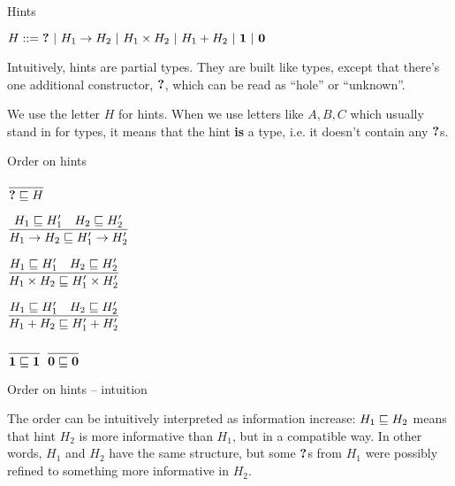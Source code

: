 \documentclass{beamer}
\begin{document}
\begin{frame}{Hints}

$H ::= \textbf{?} \ |\  H_1 \to H_2 \ |\  H_1 \times H_2 \ |\  H_1 + H_2 \ |\  \textbf{1} \ |\  \textbf{0}$

\vspace{2em}

Intuitively, hints are partial types. They are built like types, except that there's one additional constructor, $\textbf{?}$, which can be read as ``hole'' or ``unknown''.

\vspace{2em}

We use the letter $H$ for hints. When we use letters like $A, B, C$ which usually stand in for types, it means that the hint \textbf{is} a type, i.e. it doesn't contain any $\textbf{?}$s.

\end{frame}

\begin{frame}{Order on hints}

\begin{center}
  $\displaystyle \frac{}{\textbf{?} \sqsubseteq H} \textsc{\footnotesize{}}$

  \vspace{2em}

  $\displaystyle \frac{H_1 \sqsubseteq H_1' \quad H_2 \sqsubseteq H_2'}{H_1 \to H_2 \sqsubseteq H'_1 \to H'_2} \textsc{\footnotesize{}}$

  \vspace{2em}

  $\displaystyle \frac{H_1 \sqsubseteq H_1' \quad H_2 \sqsubseteq H_2'}{H_1 \times H_2 \sqsubseteq H_1' \times H_2'} \textsc{\footnotesize{}}$

  \vspace{2em}

  $\displaystyle \frac{H_1 \sqsubseteq H_1' \quad H_2 \sqsubseteq H_2'}{H_1 + H_2 \sqsubseteq H_1' + H_2'} \textsc{\footnotesize{}}$

  \vspace{2em}

  $\displaystyle \frac{}{\textbf{1} \sqsubseteq \textbf{1}} \textsc{\footnotesize{}}$ \quad
  $\displaystyle \frac{}{\textbf{0} \sqsubseteq \textbf{0}} \textsc{\footnotesize{}}$
\end{center}

\end{frame}

\begin{frame}{Order on hints -- intuition}

The order can be intuitively interpreted as information increase: $H_1 \sqsubseteq H_2$ means that hint $H_2$ is more informative than $H_1$, but in a compatible way. In other words, $H_1$ and $H_2$ have the same structure, but some $\textbf{?}$s from $H_1$ were possibly refined to something more informative in $H_2$.

\end{frame}
\end{document}

